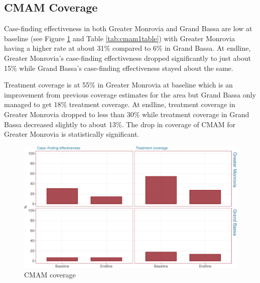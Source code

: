 \documentclass[12pt,a4paper]{article}
\begin{document}
\newpage

\hypertarget{cmam-coverage-1}{%
\subsection{CMAM Coverage}\label{cmam-coverage-1}}

Case-finding effectiveness in both Greater Monrovia and Grand Bassa are low at baseline (see Figure \ref{fig:cmam1plot} and Table \ref{tab:cmam1table}) with Greater Monrovia having a higher rate at about 31\% compared to 6\% in Grand Bassa. At endline, Greater Monrovia's case-finding effectiveness dropped significantly to just about 15\% while Grand Bassa's case-finding effectiveness stayed about the same.

Treatment coverage is at 55\% in Greater Monrovia at baseline which is an improvement from previous coverage estimates for the area but Grand Bassa only managed to get 18\% treatment coverage. At endline, treatment coverage in Greater Monrovia dropped to less than 30\% while treatment coverage in Grand Bassa decreased slightly to about 13\%. The drop in coverage of CMAM for Greater Monrovia is statistically significant.

\begin{figure}[H]

{\centering \includegraphics{liberiaCoverageFinalReport_files/figure-latex/cmam1plot-1} 

}

\caption{CMAM coverage}\label{fig:cmam1plot}
\end{figure}
\end{document}
